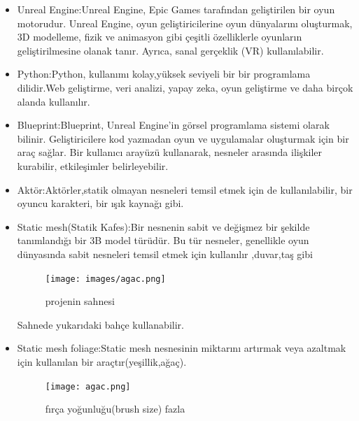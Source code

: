 \documentclass[12pt,a4paper]{article}
\begin{document}
		\begin{itemize}
			\item Unreal Engine:Unreal Engine, Epic Games tarafından geliştirilen bir oyun motorudur. Unreal Engine, oyun geliştiricilerine oyun dünyalarını oluşturmak, 3D modelleme, fizik ve animasyon gibi çeşitli özelliklerle oyunların geliştirilmesine olanak tanır. Ayrıca, sanal gerçeklik (VR) kullanılabilir. 
			\item Python:Python, kullanımı kolay,yüksek seviyeli bir bir programlama dilidir.Web geliştirme, veri analizi, yapay zeka, oyun geliştirme ve daha birçok alanda kullanılır. 
			\item Blueprint:Blueprint, Unreal Engine'in görsel programlama sistemi olarak bilinir. Geliştiricilere kod yazmadan oyun ve uygulamalar oluşturmak için bir araç sağlar. Bir kullanıcı arayüzü kullanarak, nesneler arasında ilişkiler kurabilir, etkileşimler belirleyebilir.
		     	\item Aktör:Aktörler,statik olmayan nesneleri temsil etmek için de kullanılabilir, bir oyuncu karakteri, bir ışık kaynağı gibi.
		     	\item Static mesh(Statik Kafes):Bir nesnenin sabit ve değişmez bir şekilde tanımlandığı bir 3B model türüdür. Bu tür nesneler, genellikle oyun dünyasında sabit nesneleri temsil etmek için kullanılır ,duvar,taş gibi
		     	\begin{center}
		     			\begin{figure}[!htbp]
		     			\texttt{[image: images/agac.png]}
		     			\caption{projenin sahnesi}
		     			\label{fig:ornek}
		     		\end{figure}
		     	\end{center}
		     	 \begin{flushleft}
		     		Sahnede  yukarıdaki  bahçe kullanabilir.
		     	\end{flushleft}
		     	\item Static mesh foliage:Static mesh nesnesinin miktarını artırmak veya azaltmak için kullanılan bir araçtır(yeşillik,ağaç).
		     		\begin{center}
		     		\begin{figure}[htbp]
		     			\centering
		     			\begin{minipage}{0.45\textwidth}
		     				\centering
		     				\texttt{[image: agac.png]}
		     				\caption{fırça yoğunluğu(brush size) fazla}
		     			\end{minipage}
		     			\hfill
		     			\begin{minipage}{0.45\textwidth}

\end{minipage}
\end{figure}
\end{center}
\end{itemize}
\end{document}
